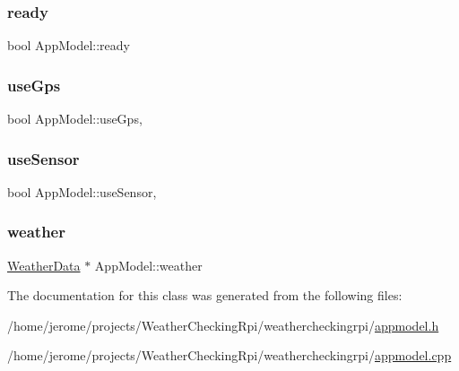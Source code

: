 \mbox{\label{class_app_model_a2af4f584bf701bff4546e889c16316d7}} 
\subsubsection{\texorpdfstring{ready}{ready}}
{\footnotesize\ttfamily bool App\+Model\+::ready\hspace{0.3cm}{\ttfamily [read]}}

\mbox{\label{class_app_model_aac827e2dce65eb299d4eec5ff4ab2155}} 
\subsubsection{\texorpdfstring{use\+Gps}{useGps}}
{\footnotesize\ttfamily bool App\+Model\+::use\+Gps\hspace{0.3cm}{\ttfamily [read]}, {\ttfamily [write]}}

\mbox{\label{class_app_model_ada296063fe2916580f532b639a546851}} 
\subsubsection{\texorpdfstring{use\+Sensor}{useSensor}}
{\footnotesize\ttfamily bool App\+Model\+::use\+Sensor\hspace{0.3cm}{\ttfamily [read]}, {\ttfamily [write]}}

\mbox{\label{class_app_model_a72dfc16433c4ca50da689205e9db9298}} 
\subsubsection{\texorpdfstring{weather}{weather}}
{\footnotesize\ttfamily \hyperlink{class_weather_data}{Weather\+Data} $\ast$ App\+Model\+::weather\hspace{0.3cm}{\ttfamily [read]}}



The documentation for this class was generated from the following files\+:\begin{DoxyCompactItemize}
\item 
/home/jerome/projects/\+Weather\+Checking\+Rpi/weathercheckingrpi/\hyperlink{appmodel_8h}{appmodel.\+h}\item 
/home/jerome/projects/\+Weather\+Checking\+Rpi/weathercheckingrpi/\hyperlink{appmodel_8cpp}{appmodel.\+cpp}\end{DoxyCompactItemize}
